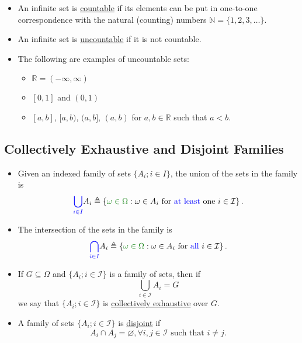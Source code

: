 \documentclass[12pt,thmsa]{article}
\let\emptyset\varnothing
\begin{document}
\begin{itemize}
	\item An infinite set is \underline{countable} if its elements can be put in one-to-one correspondence with the natural (counting) numbers \(\mathbb{N} = \{1, 2, 3, \ldots\}\).
	
	\item An infinite set is \underline{uncountable} if it is not countable.
	
	\item The following are examples of uncountable sets:
	\begin{itemize}
		\item \(\mathbb{R} = (-\infty, \infty)\)
		\item \([0, 1]\) and \((0, 1)\)
		\item \([a, b]\), \([a, b)\), \((a, b]\), \((a, b)\) for \(a, b \in \mathbb{R}\) such that \(a < b\).
	\end{itemize}
\end{itemize}

\subsection{Collectively Exhaustive and Disjoint Families} %

\begin{itemize}
	\item Given an indexed family of sets $\{A_i; i \in I\}$, the union of the sets in the family is
	\[ 
	{\color{blue}{\bigcup_{i \in I}}} A_{i} \triangleq\left\{ {\color{forestgreen}{\omega \in \Omega}}: \omega \in A_{i} \text { for } {\color{blue}{ \text{at least}}} \text{ one } i \in \mathcal{I} \right\}.
	\]
	\item The intersection of the sets in the family is
	\[
	{\color{blue}{\bigcap_{i \in I}}} A_{i} \triangleq\left\{ {\color{forestgreen}{\omega \in \Omega}}: \omega \in A_{i} \text { for } {\color{blue}{ \text{all } }} i \in \mathcal{I} \right\}.
	\]

	\item If $G \subseteq \Omega$ and $\{A_i; i \in \mathcal{I}\}$ is a family of sets, then if
	\[
	\bigcup_{i \in \mathcal{I}} A_i = G
	\]
	we say that $\{A_i; i \in \mathcal{I}\}$ is \underline{collectively exhaustive} over $G$.
	
	\item A family of sets $\{A_i; i \in \mathcal{I}\}$ is \underline{disjoint} if
	\[
	A_i \cap A_j = \emptyset, \forall i, j \in \mathcal{I} \text{ such that } i \neq j.
	\]
\end{itemize}
\end{document}
